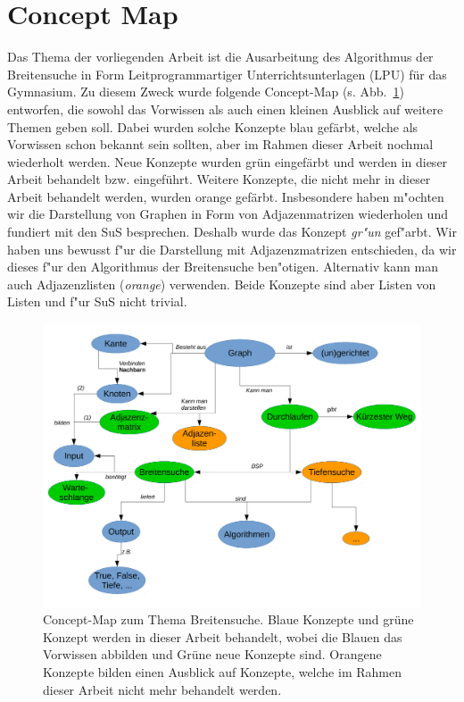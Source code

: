 \section{Concept Map}

Das Thema der vorliegenden Arbeit ist die Ausarbeitung des Algorithmus der Breitensuche in Form Leitprogrammartiger Unterrichtsunterlagen (LPU) für das Gymnasium.  
Zu diesem Zweck wurde folgende Concept-Map (s. Abb.~\ref{fig:cmap}) entworfen, die sowohl das Vorwissen als auch einen kleinen Ausblick auf weitere Themen geben soll.
Dabei wurden solche Konzepte blau gefärbt, welche als Vorwissen schon bekannt sein sollten, aber im Rahmen dieser Arbeit nochmal wiederholt werden. 
Neue Konzepte wurden grün eingefärbt und werden in dieser Arbeit behandelt bzw. eingeführt.
Weitere Konzepte, die nicht mehr in dieser Arbeit behandelt werden, wurden orange gefärbt. 
Insbesondere haben m"ochten wir die Darstellung von Graphen in Form von Adjazenmatrizen wiederholen und fundiert mit den SuS besprechen. 
Deshalb wurde das Konzept \emph{gr"un} gef"arbt. 
Wir haben uns bewusst f"ur die Darstellung mit Adjazenzmatrizen entschieden, da wir dieses f"ur den Algorithmus der Breitensuche ben"otigen. 
Alternativ kann man auch Adjazenzlisten (\emph{orange}) verwenden.
Beide Konzepte sind aber Listen von Listen und f"ur SuS nicht trivial.

\begin{figure}[htb]
\begin{center}
\includegraphics[width=.99\textwidth]{../cmap/bsuche_cmap.pdf}
\caption{Concept-Map zum Thema Breitensuche.
Blaue Konzepte und grüne Konzept werden in dieser Arbeit behandelt, wobei die Blauen das Vorwissen abbilden und Grüne neue Konzepte sind. 
Orangene Konzepte bilden einen Ausblick auf Konzepte, welche im Rahmen dieser Arbeit nicht mehr behandelt werden. 
}
\label{fig:cmap}
\end{center}
\end{figure}

